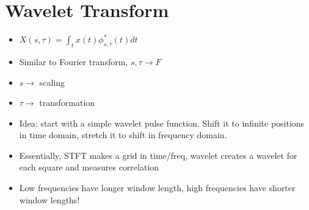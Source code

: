 \documentclass[12pt, letter]{article}
\begin{document}
\section{Wavelet Transform}%
\label{sec:wavelet_transform}
\begin{itemize}
	\item $X(s,\tau) = \int_t x(t)\phi^*_{s,\tau}(t)dt$
	\item Similar to Fourier transform, $s,\tau \to F$
	\item $s \to $ scaling
	\item $\tau \to$ transformation
	\item Idea: start with a simple wavelet pulse function. Shift it to infinite positions in time domain, stretch it to shift in frequency domain.
	\item Essentially, STFT makes a grid in time/freq, wavelet creates a wavelet for each square and measures correlation
	\item Low frequencies have longer window length, high frequencies have shorter window lengths!
\end{itemize}
\end{document}
